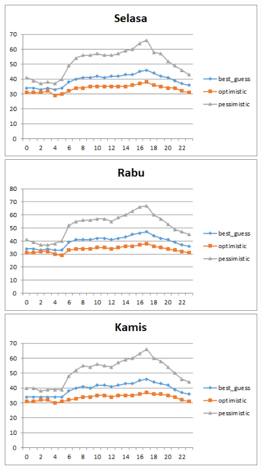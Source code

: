 \begin{figure}[H]
				\centering		
				\includegraphics[]{Gambar/selasasampel224072017reverse.png}
				\includegraphics[]{Gambar/rabusampel224072017reverse.png}
				\includegraphics[]{Gambar/kamissampel224072017reverse.png}
\end{figure}			
			
